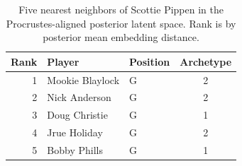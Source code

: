 \begin{table}[htbp]
  \centering\small
  \begin{tabular}{rllc}
    \toprule
    Rank & Player & Position & Archetype \\
    \midrule
    1 & Mookie Blaylock & G & 2 \\
    2 & Nick Anderson & G & 2 \\
    3 & Doug Christie & G & 1 \\
    4 & Jrue Holiday & G & 2 \\
    5 & Bobby Phills & G & 1 \\
    \bottomrule
  \end{tabular}
  \caption{Five nearest neighbors of Scottie Pippen in the Procrustes-aligned posterior latent space. Rank is by posterior mean embedding distance.}
  \label{tab:Scottie_Pippen_neighbors}
\end{table}

